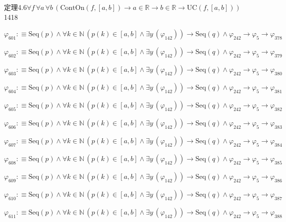 \begin{fullproof}{定理4.6}{$\forall f\,\forall a\,\forall b\,(\mathrm{ContOn}(f,[a,b]) \to a \in \mathbb{R} \to b \in \mathbb{R} \to \mathrm{UC}(f,[a,b]))$}{1418}
\begin{abbrevlist}
\item $\varphi_{601} :\equiv \mathrm{Seq}(p) \land \forall k \in \mathbb{N}\,(p(k) \in [a,b] \land \exists y\,(\varphi_{142})) \to \mathrm{Seq}(q) \land \varphi_{242} \to \varphi_{5} \to \varphi_{378}$
\item $\varphi_{602} :\equiv \mathrm{Seq}(p) \land \forall k \in \mathbb{N}\,(p(k) \in [a,b] \land \exists y\,(\varphi_{142})) \to \mathrm{Seq}(q) \land \varphi_{242} \to \varphi_{5} \to \varphi_{379}$
\item $\varphi_{603} :\equiv \mathrm{Seq}(p) \land \forall k \in \mathbb{N}\,(p(k) \in [a,b] \land \exists y\,(\varphi_{142})) \to \mathrm{Seq}(q) \land \varphi_{242} \to \varphi_{5} \to \varphi_{380}$
\item $\varphi_{604} :\equiv \mathrm{Seq}(p) \land \forall k \in \mathbb{N}\,(p(k) \in [a,b] \land \exists y\,(\varphi_{142})) \to \mathrm{Seq}(q) \land \varphi_{242} \to \varphi_{5} \to \varphi_{381}$
\item $\varphi_{605} :\equiv \mathrm{Seq}(p) \land \forall k \in \mathbb{N}\,(p(k) \in [a,b] \land \exists y\,(\varphi_{142})) \to \mathrm{Seq}(q) \land \varphi_{242} \to \varphi_{5} \to \varphi_{382}$
\item $\varphi_{606} :\equiv \mathrm{Seq}(p) \land \forall k \in \mathbb{N}\,(p(k) \in [a,b] \land \exists y\,(\varphi_{142})) \to \mathrm{Seq}(q) \land \varphi_{242} \to \varphi_{5} \to \varphi_{383}$
\item $\varphi_{607} :\equiv \mathrm{Seq}(p) \land \forall k \in \mathbb{N}\,(p(k) \in [a,b] \land \exists y\,(\varphi_{142})) \to \mathrm{Seq}(q) \land \varphi_{242} \to \varphi_{5} \to \varphi_{384}$
\item $\varphi_{608} :\equiv \mathrm{Seq}(p) \land \forall k \in \mathbb{N}\,(p(k) \in [a,b] \land \exists y\,(\varphi_{142})) \to \mathrm{Seq}(q) \land \varphi_{242} \to \varphi_{5} \to \varphi_{385}$
\item $\varphi_{609} :\equiv \mathrm{Seq}(p) \land \forall k \in \mathbb{N}\,(p(k) \in [a,b] \land \exists y\,(\varphi_{142})) \to \mathrm{Seq}(q) \land \varphi_{242} \to \varphi_{5} \to \varphi_{386}$
\item $\varphi_{610} :\equiv \mathrm{Seq}(p) \land \forall k \in \mathbb{N}\,(p(k) \in [a,b] \land \exists y\,(\varphi_{142})) \to \mathrm{Seq}(q) \land \varphi_{242} \to \varphi_{5} \to \varphi_{387}$
\item $\varphi_{611} :\equiv \mathrm{Seq}(p) \land \forall k \in \mathbb{N}\,(p(k) \in [a,b] \land \exists y\,(\varphi_{142})) \to \mathrm{Seq}(q) \land \varphi_{242} \to \varphi_{5} \to \varphi_{388}$

\end{abbrevlist}
\end{fullproof}
